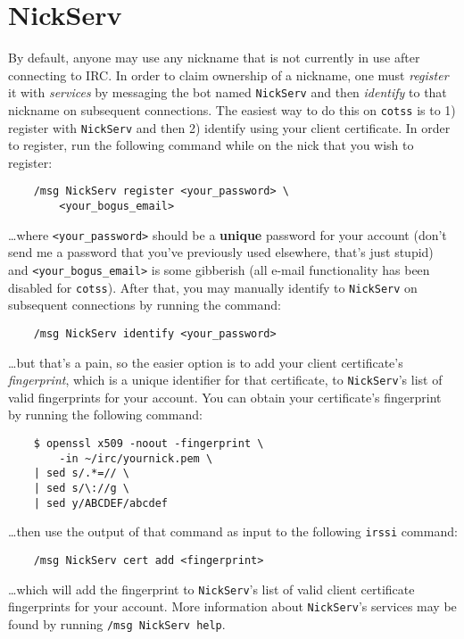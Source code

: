 \documentclass{article}
\begin{document}
{\section{NickServ}
By default, anyone may use any nickname that is not currently in use after connecting to IRC.  In order to claim ownership of a nickname, one must \textit{register} it with \textit{services} by messaging the bot named \texttt{NickServ} and then \textit{identify} to that nickname on subsequent connections.  The easiest way to do this on \texttt{cotss} is to 1) register with \texttt{NickServ} and then 2) identify using your client certificate.  In order to register, run the following command while on the nick that you wish to register:
\begin{lstlisting}
    /msg NickServ register <your_password> \
        <your_bogus_email>
\end{lstlisting}
\ldots where \texttt{<your\_password>} should be a \textbf{unique} password for your account (don't send me a password that you've previously used elsewhere, that's just stupid) and \texttt{<your\_bogus\_email>} is some gibberish (all e-mail functionality has been disabled for \texttt{cotss}).  After that, you may manually identify to \texttt{NickServ} on subsequent connections by running the command:
\begin{lstlisting}
    /msg NickServ identify <your_password>
\end{lstlisting}
\ldots but that's a pain, so the easier option is to add your client certificate's \textit{fingerprint}, which is a unique identifier for that certificate, to \texttt{NickServ}'s list of valid fingerprints for your account.  You can obtain your certificate's fingerprint by running the following command:
\begin{lstlisting}
    $ openssl x509 -noout -fingerprint \
        -in ~/irc/yournick.pem \
	| sed s/.*=// \
	| sed s/\://g \
	| sed y/ABCDEF/abcdef
\end{lstlisting}
\ldots then use the output of that command as input to the following \texttt{irssi} command:
\begin{lstlisting}
    /msg NickServ cert add <fingerprint>
\end{lstlisting}
\ldots which will add the fingerprint to \texttt{NickServ}'s list of valid client certificate fingerprints for your account.  More information about \texttt{NickServ}'s services may be found by running \texttt{/msg NickServ help}.

}
\end{document}
